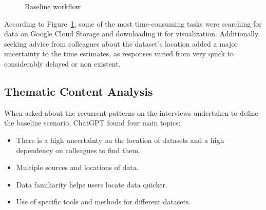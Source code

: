 \documentclass[
  oneside,
  open=any]{scrbook}
\providecommand{\tightlist}{%
  \setlength{\itemsep}{0pt}\setlength{\parskip}{0pt}}\usepackage{longtable,booktabs,array}
\begin{document}
\begin{figure}[H]


\caption{\label{fig-baseline}Baseline workflow}

\end{figure}%

According to Figure~\ref{fig-baseline}, some of the most time-consuming
tasks were searching for data on Google Cloud Storage and downloading it
for visualization. Additionally, seeking advice from colleagues about
the dataset's location added a major uncertainty to the time estimates,
as responses varied from very quick to considerably delayed or non
existent.

\subsection{Thematic Content Analysis}\label{thematic-content-analysis}

When asked about the recurrent patterns on the interviews undertaken to
define the baseline scenario, ChatGPT found four main topics:

\begin{itemize}
\tightlist
\item
  There is a high uncertainty on the location of datasets and a high
  dependency on colleagues to find them.
\item
  Multiple sources and locations of data.
\item
  Data familiarity helps users locate data quicker.
\item
  Use of specific tools and methods for different datasets.
\end{itemize}
\end{document}
